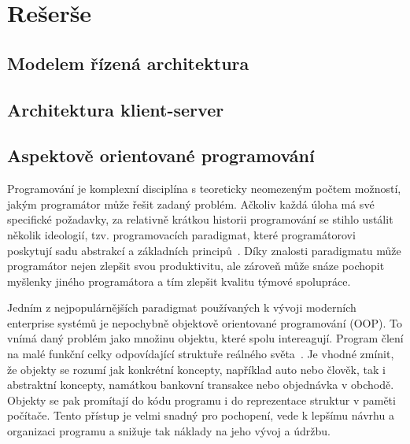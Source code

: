 
\chapter{Rešerše}\label{ch:reserse}

\section{Modelem řízená architektura}


\section{Architektura klient-server}\label{sec:client-server}


\section{Aspektově orientované programování}

Programování je komplexní disciplína s teoreticky
neomezeným počtem možností, jakým programátor může
řešit zadaný problém. Ačkoliv každá úloha má své specifické
požadavky, za relativně krátkou historii programování se
stihlo ustálit několik ideologií, tzv. programovacích
paradigmat, které programátorovi poskytují sadu abstrakcí
a základních principů~\cite{van2009programming}.
Díky znalosti paradigmatu může programátor nejen zlepšit
svou produktivitu, ale zároveň může snáze pochopit myšlenky
jiného programátora a tím zlepšit kvalitu týmové spolupráce.

Jedním z nejpopulárnějších paradigmat používaných k
vývoji moderních enterprise systémů je nepochybně
objektově orientované programování (\gls{OOP}). To vnímá daný problém
jako množinu objektu, které spolu intereagují. Program
člení na malé funkční celky odpovídající struktuře
reálného světa~\cite{rentsch1982object}. Je vhodné zmínit,
že objekty se rozumí jak konkrétní koncepty, například
auto nebo člověk, tak i abstraktní koncepty,
namátkou bankovní transakce nebo objednávka v obchodě.
Objekty se pak promítají do kódu programu i do
reprezentace struktur v paměti počítače.
Tento přístup je velmi snadný pro pochopení,
vede k lepšímu návrhu a organizaci programu a snižuje
tak náklady na jeho vývoj a údržbu.

